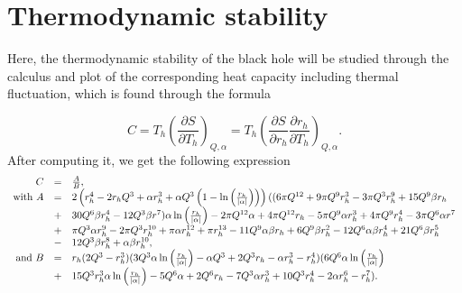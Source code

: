 \documentclass[10pt,letterpaper]{article}
\begin{document}
\section{Thermodynamic stability}

Here, the thermodynamic stability of the black hole will be studied through  the calculus and plot of the corresponding heat capacity including thermal fluctuation, which is found through the formula

\begin{equation}
C=T_h\left(\frac{\partial S}{\partial T_h}\right)_{Q,\alpha}=T_h\left(\frac{\partial S}{\partial r_h}\frac{\partial r_h}{\partial T_h}\right)_{Q,\alpha}.
\end{equation}
After computing it, we get the following expression
\begin{eqnarray}
\begin{array}{r c l}
C&=&\frac{A}{B},\\
\text{with} \ A&=& 2\left(r_h^4-2r_hQ^3+\alpha r_h^3+\alpha Q^3\left(1-\ln\left(\frac{r_h}{|\alpha|}\right)\right)\right)((6\pi Q^{12}+9\pi Q^9r_h^3-3\pi Q^3r_h^9+15Q^9\beta r_h\\
&+&30Q^6\beta r_h^4-12Q^3\beta r^7)\alpha\ln\left(\frac{r_h}{|\alpha|}\right)-2\pi Q^{12}\alpha+4\pi Q^{12} r_h-5\pi Q^9\alpha r_h^3+4\pi Q^9 r_h^4-3\pi Q^6\alpha r^7\\
&+&\pi Q^3\alpha r_h^9-2\pi Q^3r_h^{10}+\pi\alpha r_h^{12}+\pi r_h^{13}-11Q^9\alpha \beta r_h+6Q^9\beta r_h^2-12Q^6\alpha \beta r_h^4+21Q^6\beta r_h^5\\
&-&12Q^3\beta r_h^8+\alpha \beta r_h^{10}, \\
\text{and} \ B&=&   r_h(2Q^3-r_h^3)(3Q^3\alpha\ln\left(\frac{r_h}{|\alpha|}\right)-\alpha Q^3+2Q^3r_h-\alpha r_h^3-r_h^4)(6Q^6\alpha\ln\left(\frac{r_h}{|\alpha|}\right)\\
&+&15Q^3r_h^3\alpha\ln\left(\frac{r_h}{|\alpha|}\right)-5Q^6\alpha+2Q^6r_h-7Q^3\alpha r_h^3+10Q^3r_h^4-2\alpha r_h^6-r_h^7).
\end{array}
\end{eqnarray}	
%
\end{document}
